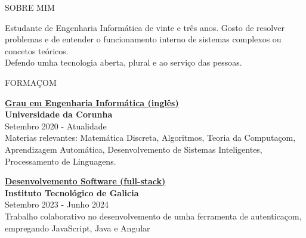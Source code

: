 \documentclass [10pt, a4paper] {extarticle}
\newcommand{\sectionlinethickness} {0.5 pt }
\newcommand{\leftcolumwidth} {0.15 }
\newcommand{\rightcolumwidth}{ 0.84 }
\newcommand {\sectiontitle}[1] {
  \vspace*{-10px}
  \begin {flushleft}
  \begin {minipage}[c]{\leftcolumwidth\textwidth}
    \begin {flushright}
      \!\MakeUppercase {#1}
      \hspace* {10px}
    \end {flushright}
  \end {minipage}
  \begin{minipage}[c]{\rightcolumwidth\textwidth}
    \begin {tikzpicture}[remember picture, overlay,blend mode=multiply]
      \draw [line width=\sectionlinethickness, namelines] (0,0) -- (15,0);
    \end {tikzpicture}
  \end{minipage}
  \end {flushleft}
}
\begin{document}
  \vspace*{-10px}
  \begin {flushleft}
  \begin {minipage}[t]{\leftcolumwidth\textwidth}
    \begin {flushright}
      \!\MakeUppercase {sobre mim}
      \hspace* {10px}
    \end {flushright}
  \end {minipage}
  \begin{minipage}[t]{\rightcolumwidth\textwidth}
    Estudante de Engenharia Informática de vinte e três anos. Gosto de resolver problemas e de entender o funcionamento interno de sistemas complexos ou concetos teóricos.\\
    Defendo umha tecnologia aberta, plural e ao serviço das pessoas.
  \end{minipage}
  \end {flushleft}


  \sectiontitle {formaçom}
  \vspace{-15px}

  \begin {flushright}
  \begin {minipage} [t] {\rightcolumwidth\textwidth}
    \begin {minipage} [t] {210pt}
      \href {https://estudos.udc.es/en/study/start/614G01V01} {\textbf {Grau em Engenharia Informática (inglês)}}\\
      \textbf {Universidade da Corunha}\\
      \hspace* {6px} \textcolor{namebottomtxt} {Setembro 2020 - Atualidade} \\ [4px]
      Materias relevantes: Matemática Discreta, Algoritmos, Teoria da Computaçom, Aprendizagem Automática, Desenvolvemento de Sistemas Inteligentes,  Processamento de Linguagens.
    \end {minipage}
    \hfill
    \begin {minipage} [t] {200pt}
      \href {https://itg.es/} {\textbf {Desenvolvemento Software (full-stack)}}\\
      \textbf {Instituto Tecnológico de Galicia}\\
      \hspace* {6px} \textcolor{namebottomtxt} {Setembro 2023 - Junho 2024} \\ [4px]
      Trabalho colaborativo no desenvolvemento de umha ferramenta de autenticaçom, empregando JavaScript, Java e Angular
    \end {minipage}
  \end {minipage}
  \end {flushright}
\end{document}
